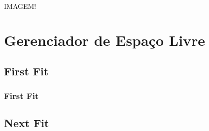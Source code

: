 \documentclass{beamer}
\begin{document}
\begin{frame}
IMAGEM!
\justifying
\end{frame}

\section{Gerenciador de Espaço Livre} 
\subsection{First Fit}
\begin{frame}
\frametitle{First Fit}


\justifying
\end{frame}

\subsection{Next Fit} 
\end{document}

